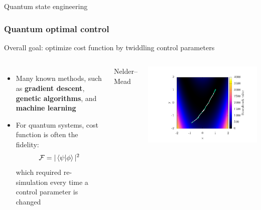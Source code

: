 \documentclass{beamer}
\begin{document}
\begin{frame}
\center \huge Quantum state engineering
\end{frame}

\begin{frame}
\frametitle{Quantum optimal control}
Overall goal: optimize cost function by twiddling control parameters
\begin{columns}
\begin{itemize}
\pause
\item Many known methods, such as \textbf{gradient descent}, \textbf{genetic algorithms}, and \textbf{machine learning}
\pause
\item For quantum systems, cost function is often the fidelity:
$$
\mathcal{F}= |\braket{\psi|\phi}|^2
$$
which required re-simulation every time a control parameter is changed
\end{itemize}
\pause
{}
\begin{center}
Nelder--Mead
\end{center}
\includegraphics[width=\textwidth]{../data/1d/NM/NM.pdf}

\end{columns}
\end{frame}
\end{document}
